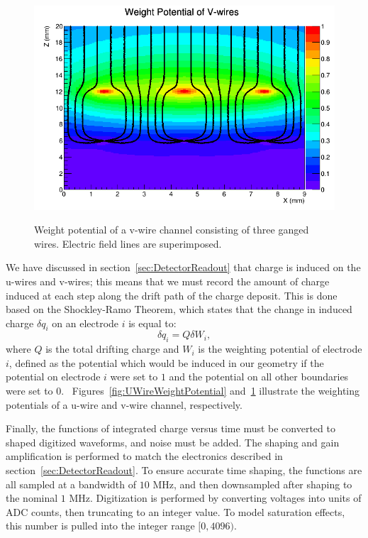 \begin{figure}
\begin{center}
\includegraphics[keepaspectratio=true,width=\textwidth]{WeightPotContoursV_WithE.png}
\end{center}
\renewcommand{\baselinestretch}{1}
\small\normalsize
\begin{quote}
\caption{Weight potential of a v-wire channel consisting of three ganged wires.  Electric field lines are superimposed.~\cite{MCDocumentRun2a}}
\label{fig:VWireWeightPotential}
\end{quote}
\end{figure}
\renewcommand{\baselinestretch}{2}
\small\normalsize

We have discussed in section~\ref{sec:DetectorReadout} that charge is induced on the u-wires and v-wires; this means that we must record the amount of charge induced at each step along the drift path of the charge deposit.  This is done based on the Shockley-Ramo Theorem, which states that the change in induced charge $\delta q_i$ on an electrode $i$ is equal to:
\begin{equation}
\delta q_i = Q \delta W_i,
\end{equation}
where $Q$ is the total drifting charge and $W_i$ is the weighting potential of electrode $i$, defined as the potential which would be induced in our geometry if the potential on electrode $i$ were set to $1$ and the potential on all other boundaries were set to $0$.~\cite{ShockleyPaper,1686997}  Figures~\ref{fig:UWireWeightPotential} and~\ref{fig:VWireWeightPotential} illustrate the weighting potentials of a u-wire and v-wire channel, respectively.

Finally, the functions of integrated charge versus time must be converted to shaped digitized waveforms, and noise must be added.  The shaping and gain amplification is performed to match the electronics described in section~\ref{sec:DetectorReadout}.  To ensure accurate time shaping, the functions are all sampled at a bandwidth of $10$ MHz, and then downsampled after shaping to the nominal $1$ MHz.  Digitization is performed by converting voltages into units of ADC counts, then truncating to an integer value.  To model saturation effects, this number is pulled into the integer range $[0, 4096)$.

